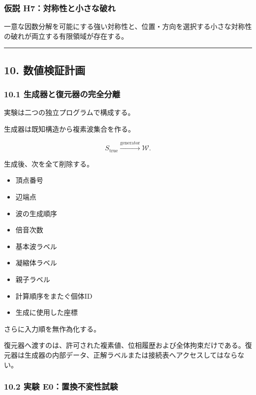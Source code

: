 \documentclass[
  a4paper,
]{ltjsarticle}
\providecommand{\tightlist}{%
  \setlength{\itemsep}{0pt}\setlength{\parskip}{0pt}}
\begin{document}
\subsubsection{仮説
H7：対称性と小さな破れ}\label{ux4eeeux8aac-h7ux5bfeux79f0ux6027ux3068ux5c0fux3055ux306aux7834ux308c}

一意な因数分解を可能にする強い対称性と、位置・方向を選択する小さな対称性の破れが両立する有限領域が存在する。

\begin{center}\rule{0.5\linewidth}{0.5pt}\end{center}

\subsection{10.
数値検証計画}\label{ux6570ux5024ux691cux8a3cux8a08ux753b}

\subsubsection{10.1
生成器と復元器の完全分離}\label{ux751fux6210ux5668ux3068ux5fa9ux5143ux5668ux306eux5b8cux5168ux5206ux96e2}

実験は二つの独立プログラムで構成する。

生成器は既知構造から複素波集合を作る。

\[
S_{\mathrm{true}}
\xrightarrow{\mathrm{generator}}
\mathcal W.
\]

生成後、次を全て削除する。

\begin{itemize}
\tightlist
\item
  頂点番号
\item
  辺端点
\item
  波の生成順序
\item
  倍音次数
\item
  基本波ラベル
\item
  凝縮体ラベル
\item
  親子ラベル
\item
  計算順序をまたぐ個体ID
\item
  生成に使用した座標
\end{itemize}

さらに入力順を無作為化する。

復元器へ渡すのは、許可された複素値、位相履歴および全体拘束だけである。復元器は生成器の内部データ、正解ラベルまたは接続表へアクセスしてはならない。

\subsubsection{10.2 実験
E0：置換不変性試験}\label{ux5b9fux9a13-e0ux7f6eux63dbux4e0dux5909ux6027ux8a66ux9a13}
\end{document}
